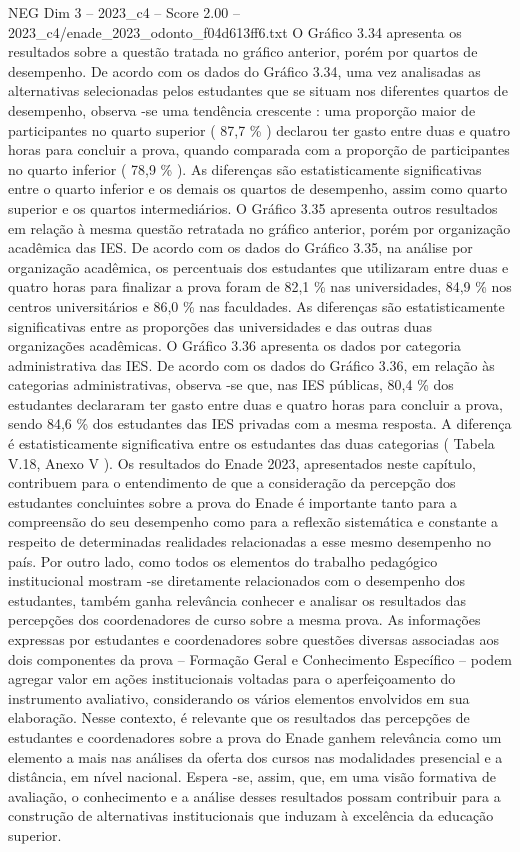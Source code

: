 \begin{textsample}{NEG Dim 3 – 2023\_c4 – Score 2.00 – 2023\_c4/enade\_2023\_odonto\_f04d613ff6.txt}
O Gráfico 3.34 apresenta os resultados sobre a questão tratada no gráfico anterior, porém por quartos de desempenho.
De acordo com os dados do Gráfico 3.34, uma vez analisadas as alternativas selecionadas pelos estudantes que se situam nos diferentes quartos de desempenho, observa -se uma tendência crescente : uma proporção maior de participantes no quarto superior ( 87,7 \% ) declarou ter gasto entre duas e quatro horas para concluir a prova, quando comparada com a proporção de participantes no quarto inferior ( 78,9 \% ).
As diferenças são estatisticamente significativas entre o quarto inferior e os demais os quartos de desempenho, assim como quarto superior e os quartos intermediários.
O Gráfico 3.35 apresenta outros resultados em relação à mesma questão retratada no gráfico anterior, porém por organização acadêmica das IES.
De acordo com os dados do Gráfico 3.35, na análise por organização acadêmica, os percentuais dos estudantes que utilizaram entre duas e quatro horas para finalizar a prova foram de 82,1 \% nas universidades, 84,9 \% nos centros universitários e 86,0 \% nas faculdades.
As diferenças são estatisticamente significativas entre as proporções das universidades e das outras duas organizações acadêmicas.
O Gráfico 3.36 apresenta os dados por categoria administrativa das IES.
De acordo com os dados do Gráfico 3.36, em relação às categorias administrativas, observa -se que, nas IES públicas, 80,4 \% dos estudantes declararam ter gasto entre duas e quatro horas para concluir a prova, sendo 84,6 \% dos estudantes das IES privadas com a mesma resposta.
A diferença é estatisticamente significativa entre os estudantes das duas categorias ( Tabela V.18, Anexo V ).
Os resultados do Enade 2023, apresentados neste capítulo, contribuem para o entendimento de que a consideração da percepção dos estudantes concluintes sobre a prova do Enade é importante tanto para a compreensão do seu desempenho como para a reflexão sistemática e constante a respeito de determinadas realidades relacionadas a esse mesmo desempenho no país.
Por outro lado, como todos os elementos do trabalho pedagógico institucional mostram -se diretamente relacionados com o desempenho dos estudantes, também ganha relevância conhecer e analisar os resultados das percepções dos coordenadores de curso sobre a mesma prova.
As informações expressas por estudantes e coordenadores sobre questões diversas associadas aos dois componentes da prova – Formação Geral e Conhecimento Específico – podem agregar valor em ações institucionais voltadas para o aperfeiçoamento do instrumento avaliativo, considerando os vários elementos envolvidos em sua elaboração.
Nesse contexto, é relevante que os resultados das percepções de estudantes e coordenadores sobre a prova do Enade ganhem relevância como um elemento a mais nas análises da oferta dos cursos nas modalidades presencial e a distância, em nível nacional.
Espera -se, assim, que, em uma visão formativa de avaliação, o conhecimento e a análise desses resultados possam contribuir para a construção de alternativas institucionais que induzam à excelência da educação superior.

\end{textsample}
